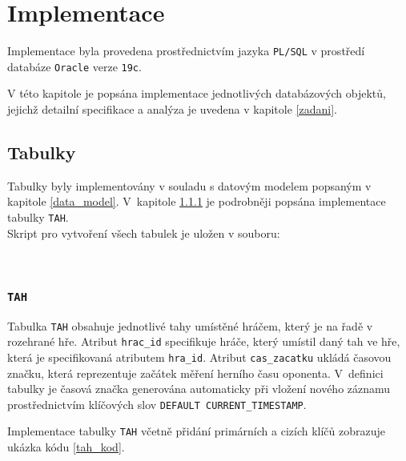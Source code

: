 \documentclass[
11pt,
a4paper,
pdftex,
czech,
titlepage
]{report}
\begin{document}
\chapter{Implementace}\label{implementace}
Implementace byla provedena prostřednictvím jazyka \texttt{PL/SQL} v prostředí databáze \texttt{Oracle} verze \texttt{19c}.

V této kapitole je popsána implementace jednotlivých databázových objektů, jejichž detailní specifikace a analýza je uvedena v kapitole \ref{zadani}.

\section{Tabulky}
Tabulky byly implementovány v souladu s datovým modelem popsaným v kapitole \ref{data_model}. V~kapitole \ref{tab_tah} je podrobněji popsána implementace tabulky \texttt{TAH}.\\

\noindent Skript pro vytvoření všech tabulek je uložen v souboru:
\begin{center}
\noindent {}\\[0.5\baselineskip]
\end{center}

\subsection{\texttt{TAH}}\label{tab_tah}
Tabulka \texttt{TAH} obsahuje jednotlivé tahy umístěné hráčem, který je na řadě v rozehrané hře. Atribut \texttt{hrac\_id} specifikuje hráče, který umístil daný tah ve hře, která je specifikovaná atributem \texttt{hra\_id}. Atribut \texttt{cas\_zacatku} ukládá časovou značku, která reprezentuje začátek měření herního času oponenta. V~definici tabulky je časová značka generována automaticky při vložení nového záznamu prostřednictvím klíčových slov \texttt{DEFAULT CURRENT\_TIMESTAMP}. 

Implementace tabulky \texttt{TAH} včetně přidání primárních a cizích klíčů zobrazuje ukázka kódu \ref{tah_kod}.
\end{document}
